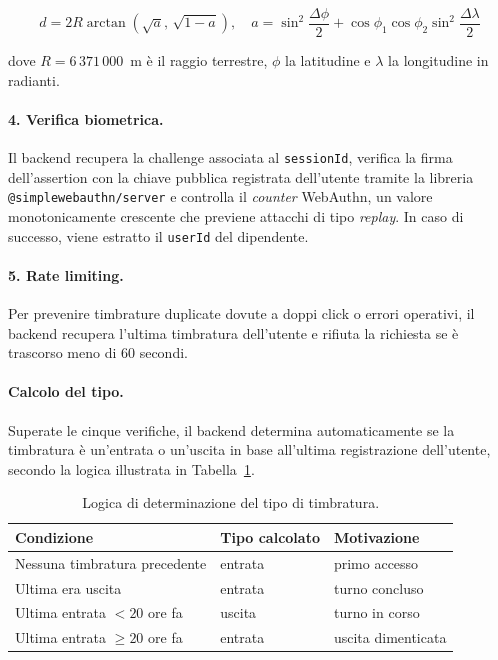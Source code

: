 \begin{equation}
  d = 2R \arctan\!\left(
    \sqrt{a},\, \sqrt{1-a}
  \right), \quad
  a = \sin^2\!\frac{\Delta\phi}{2}
    + \cos\phi_1 \cos\phi_2 \sin^2\!\frac{\Delta\lambda}{2}
  \label{eq:haversine}
\end{equation}

dove $R = 6\,371\,000$~m è il raggio terrestre, $\phi$ la latitudine
e $\lambda$ la longitudine in radianti.

\paragraph{4. Verifica biometrica.}
Il backend recupera la challenge associata al \texttt{sessionId},
verifica la firma dell'assertion con la chiave pubblica registrata
dell'utente tramite la libreria \texttt{@simplewebauthn/server} e
controlla il \emph{counter} WebAuthn, un valore monotonicamente
crescente che previene attacchi di tipo \emph{replay}. In caso di
successo, viene estratto il \texttt{userId} del dipendente.

\paragraph{5. Rate limiting.}
Per prevenire timbrature duplicate dovute a doppi click o errori
operativi, il backend recupera l'ultima timbratura dell'utente e
rifiuta la richiesta se è trascorso meno di 60 secondi.

\paragraph{Calcolo del tipo.}
Superate le cinque verifiche, il backend determina automaticamente se
la timbratura è un'entrata o un'uscita in base all'ultima registrazione
dell'utente, secondo la logica illustrata in
Tabella~\ref{tab:calcolo-tipo}.

\begin{table}[ht]
\centering
\caption{Logica di determinazione del tipo di timbratura.}
\label{tab:calcolo-tipo}
\begin{tabular}{lll}
\toprule
\textbf{Condizione} & \textbf{Tipo calcolato} & \textbf{Motivazione} \\
\midrule
Nessuna timbratura precedente  & entrata & primo accesso \\
Ultima era uscita              & entrata & turno concluso \\
Ultima entrata $< 20$ ore fa   & uscita  & turno in corso \\
Ultima entrata $\geq 20$ ore fa & entrata & uscita dimenticata \\
\bottomrule
\end{tabular}
\end{table}

